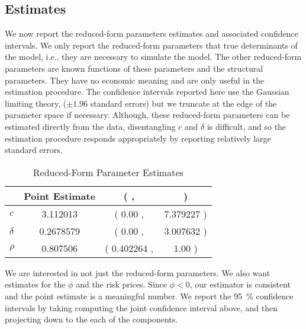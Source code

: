 \documentclass[11pt, letterpaper, twoside]{article}
\begin{document}
\subsection{Estimates}

We now report the reduced-form parameters estimates and associated confidence intervals. We only report the reduced-form parameters that true determinants of the model, i.e., they are necessary to simulate the model. The other reduced-form parameters are known functions of these parameters and the structural parameters. They have no economic meaning and are only useful in the estimation procedure. The confidence intervals reported here use the Gaussian limiting theory, ($\pm 1.96$ standard errors) but we truncate at the edge of the parameter space if necessary. Although, these reduced-form parameters can be estimated directly from the data, disentangling $c$ and $\delta$ is difficult, and so the estimation procedure responds appropriately by reporting relatively large standard errors. 


\begin{table}[htb]
  \caption{Reduced-Form Parameter Estimates} 
  \label{tbl:reduced_form_parameters}

  \centering

  \begin{tabularx}{.5\textwidth}{X | S >{{(}} S[table-space-text-pre={(}] <{{,\,}}
    S[table-space-text-pre={\hspace{-1cm}}] <{{)}}}
%
    \toprule
    & {Point Estimate} &  \\
    \midrule
    $c$     & 3.112013 & 0.00 & 7.379227 \\
    $\delta$  & 0.2678579 & 0.00 & 3.007632 \\
    $\rho$   & 0.807506 & 0.402264 & 1.00 \\
    \bottomrule 
  \end{tabularx}
\end{table}


We are interested in not just the reduced-form parameters. We also want estimates for the $\phi$ and the risk prices. Since $\phi < 0$, our estimator is consistent and the point estimate is a meaningful number. We report the \SI{95}{\percent} confidence intervals by taking computing the joint confidence interval above, and then projecting down to the each of the components.
\end{document}
